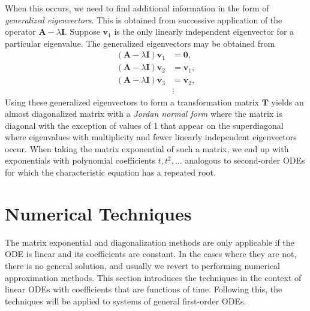When this occurs, we need to find additional information in the form of \emph{generalized eigenvectors}. This is obtained from successive application of the operator $\mathbf{A} - \lambda \mathbf{I}$. Suppose $\mathbf{v}_1$ is the only linearly independent eigenvector for a particular eigenvalue. The generalized eigenvectors may be obtained from
\begin{align}
  ( \mathbf{A} - \lambda \mathbf{I} ) \mathbf{v}_1 &= \mathbf{0}, \nonumber \\
  ( \mathbf{A} - \lambda \mathbf{I} ) \mathbf{v}_2 &= \mathbf{v}_1, \nonumber \\
  ( \mathbf{A} - \lambda \mathbf{I} ) \mathbf{v}_3 &= \mathbf{v}_2,  \nonumber \\
  &\vdots    \nonumber
\end{align}
Using these generalized eigenvectors to form a transformation matrix $\mathbf{T}$ yields an almost diagonalized matrix with a \emph{Jordan normal form} where the matrix is diagonal with the exception of values of 1 that appear on the superdiagonal where eigenvalues with multiplicity and fewer linearly independent eigenvectors occur. When taking the matrix exponential of such a matrix, we end up with exponentials with polynomial coefficients $t, t^2, \ldots$ analogous to second-order ODEs for which the characteristic equation has a repeated root.



\section{Numerical Techniques} \label{Sec:ode_numericalTechniques}

The matrix exponential and diagonalization methods are only applicable if the ODE is linear and its coefficients are constant. In the cases where they are not, there is no general solution, and usually we revert to performing numerical approximation methods. This section introduces the techniques in the context of linear ODEs with coefficients that are functions of time. Following this, the techniques will be applied to systems of general first-order ODEs. 

